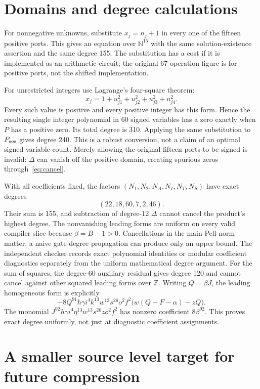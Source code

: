 \documentclass[11pt]{article}
\newcommand{\N}{\mathbb N}
\newcommand{\Z}{\mathbb Z}
\begin{document}
\section{Domains and degree calculations}

For nonnegative unknowns, substitute \(x_j=n_j+1\) in every one of the fifteen positive ports. This gives an equation over \(\N^{15}\) with the same solution-existence assertion and the same degree 155. The substitution has a cost if it is implemented as an arithmetic circuit; the original 67-operation figure is for positive ports, not the shifted implementation.

For unrestricted integers use Lagrange's four-square theorem:
\[
 x_j=1+u_{j1}^2+u_{j2}^2+u_{j3}^2+u_{j4}^2.
\]
Every such value is positive and every positive integer has this form. Hence the resulting single integer polynomial in 60 signed variables has a zero exactly when \(P\) has a positive zero. Its total degree is 310. Applying the same substitution to \(P_{\rm sos}\) gives degree 240. This is a robust conversion, not a claim of an optimal signed-variable count. Merely allowing the original fifteen ports to be signed is invalid: \(\Delta\) can vanish off the positive domain, creating spurious zeros through~\eqref{eq:cancel}.

With all coefficients fixed, the factors \((N_1,N_2,N_A,N_I,N_T,N_S)\) have exact degrees
\[
 (22,18,60,7,2,46).
\]
Their sum is 155, and subtraction of degree-12 \(\Delta\) cannot cancel the product's highest degree. The nonvanishing leading forms are uniform on every valid compiler slice because \(\beta=B-1>0\). Cancellations in the main Pell norm matter: a naive gate-degree propagation can produce only an upper bound. The independent checker records exact polynomial identities or modular coefficient diagnostics separately from the uniform mathematical degree argument. For the sum of squares, the degree-60 auxiliary residual gives degree 120 and cannot cancel against other squared leading forms over \(\Z\). Writing \(Q=\beta J\), the leading homogeneous form is explicitly
\[
 -8Q^{91}h\gamma i^4k^{13}w^{13}s^{26}o^2f^2
 \bigl(w(Q-F-\alpha)-zQ\bigr).
\]
The monomial \(J^{92}h\gamma i^4\eta^{13}w^{13}s^{26}zo^2f^2\) has nonzero coefficient \(8\beta^{92}\). This proves exact degree uniformly, not just at diagnostic coefficient assignments.

\section{A smaller source level target for future compression}
\end{document}
